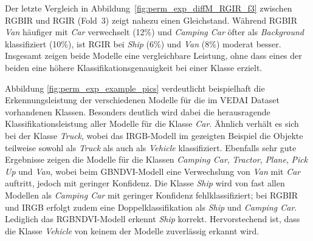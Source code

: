 %     

Der letzte Vergleich in Abbildung~\ref{fig:perm_exp_diffM_RGIR_f3} zwischen RGBIR und RGIR (Fold~3) zeigt nahezu einen Gleichstand. Während RGBIR \textit{Van} häufiger mit \textit{Car} verwechselt (12\%) und \textit{Camping Car} öfter als \textit{Background} klassifiziert (10\%), ist RGIR bei \textit{Ship} (6\%) und \textit{Van} (8\%) moderat besser. Insgesamt zeigen beide Modelle eine vergleichbare Leistung, ohne dass eines der beiden eine höhere Klassifikationsgenauigkeit bei einer Klasse erzielt.

Abbildung \ref{fig:perm_exp_example_pics} verdeutlicht beispielhaft die Erkennungsleistung der verschiedenen Modelle für die im \acrshort{VEDAI} Dataset vorhandenen Klassen. Besonders deutlich wird dabei die herausragende Klassifikationsleistung aller Modelle für die Klasse \textit{Car}. Ähnlich verhält es sich bei der Klasse \textit{Truck}, wobei das IRGB-Modell im gezeigten Beispiel die Objekte teilweise sowohl als \textit{Truck} als auch als \textit{Vehicle} klassifiziert. Ebenfalls sehr gute Ergebnisse zeigen die Modelle für die Klassen \textit{Camping Car}, \textit{Tractor}, \textit{Plane}, \textit{Pick Up} und \textit{Van}, wobei beim GBNDVI-Modell eine Verwechslung von \textit{Van} mit \textit{Car} auftritt, jedoch mit geringer Konfidenz. Die Klasse \textit{Ship} wird von fast allen Modellen als \textit{Camping Car} mit geringer Konfidenz fehlklassifiziert; bei RGBIR und IRGB erfolgt zudem eine Doppelklassifikation als \textit{Ship} und \textit{Camping Car}. Lediglich das RGBNDVI-Modell erkennt \textit{Ship} korrekt. Hervorstechend ist, dass die Klasse \textit{Vehicle} von keinem der Modelle zuverlässig erkannt wird.


\FloatBarrier

